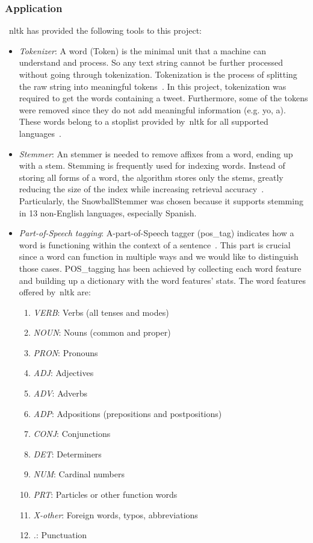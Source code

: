 \subsubsection{Application}
~\ac{nltk} has provided the following tools to this project:
\begin{itemize}
	
	\item \textit{Tokenizer}: A word (Token) is the minimal unit that a machine can understand and process. So any text string cannot be further processed without going through tokenization. Tokenization is the process of splitting the raw string into meaningful tokens~\cite{nltk}. In this project, tokenization was required to get the words containing a tweet. Furthermore, some of the tokens were removed since they do not add meaningful information (e.g. yo, a). These words belong to a stoplist provided by~\ac{nltk} for all supported languages~\cite{nltk}.
	\item \textit{Stemmer}: An stemmer is needed to remove affixes from a word, ending up with a stem. Stemming is frequently used for indexing words. Instead of storing all forms of a word, the algorithm stores only the stems, greatly reducing the size of the index while increasing retrieval accuracy~\cite{nltk}. Particularly, the SnowballStemmer was chosen because it supports stemming in 13 non-English languages, especially Spanish.
	\item \textit{Part-of-Speech tagging}:  A-part-of-Speech tagger (pos\_tag) indicates how a word is functioning within the context of a sentence~\cite{pos}. This part is crucial since a word can function in multiple ways and we would like to distinguish those cases. POS\_tagging has been achieved by collecting each word feature and building up a dictionary with the word features' stats. The word features offered by~\ac{nltk} are:
	\begin{enumerate}
		\item \textit{VERB}: Verbs (all tenses and modes)
		\item \textit{NOUN}: Nouns (common and proper)
		\item \textit{PRON}: Pronouns
		\item \textit{ADJ}: Adjectives
		\item \textit{ADV}: Adverbs
		\item \textit{ADP}: Adpositions (prepositions and postpositions)
		\item \textit{CONJ}: Conjunctions
		\item \textit{DET}: Determiners
		\item \textit{NUM}: Cardinal numbers
		\item \textit{PRT}: Particles or other function words
		\item \textit{X-other}: Foreign words, typos, abbreviations
		\item \textit{.}: Punctuation
	\end{enumerate}
\end{itemize}


